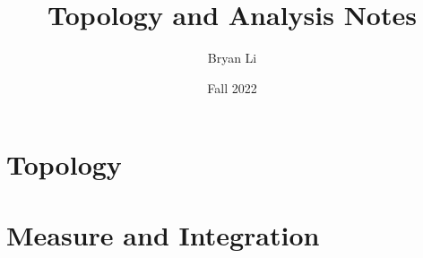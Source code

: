 \documentclass{mimosis}
\title{Topology and Analysis Notes}
\author{Bryan Li}
\date{Fall 2022}
\begin{document}
    \frontmatter
    \maketitle
    \tableofcontents

    \mainmatter
    \part{Topology}
    
    
    
    
    \part{Measure and Integration}
    
\end{document}
